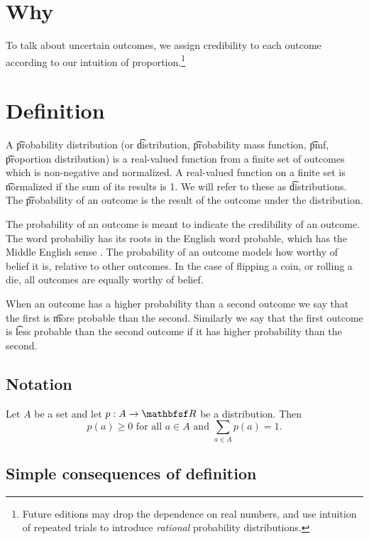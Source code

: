 

\section*{Why}

To talk about uncertain outcomes, we assign credibility to each outcome according to our intuition of proportion.\footnote{Future editions may drop the dependence on real numbers, and use intuition of repeated trials to introduce \textit{rational} probability distributions.}

\section*{Definition}

A \t{probability distribution} (or \t{distribution}, \t{probability mass function}, \t{pmf}, \t{proportion distribution}) is a real-valued function from a finite set of outcomes which is non-negative and normalized.
A real-valued function on a finite set is \t{normalized} if the sum of its results is 1.
We will refer to these as \t{distributions}.
The \t{probability of an outcome} is the result of the outcome under the distribution.

The probability of an outcome is meant to indicate the credibility of an outcome.
The word probabiliy has its roots in the English word probable, which has the Middle English sense .
The probability of an outcome models how worthy of belief it is, relative to other outcomes.
In the case of flipping a coin, or rolling a die, all outcomes are equally worthy of belief.

When an outcome has a higher probability than a second outcome we say that the first is \t{more probable} than the second.
Similarly we say that the first outcome is \t{less probable} than the second outcome if it has higher probability than the second.

\subsection*{Notation}

Let $A$ be a set and let $p: A \to \R $ be a distribution.
Then
    \[
\textstyle
p(a) \geq 0 \text{ for all } a \in A \text{ and } \sum_{a \in A} p(a) = 1.
    \]

\subsection*{Simple consequences of definition}

